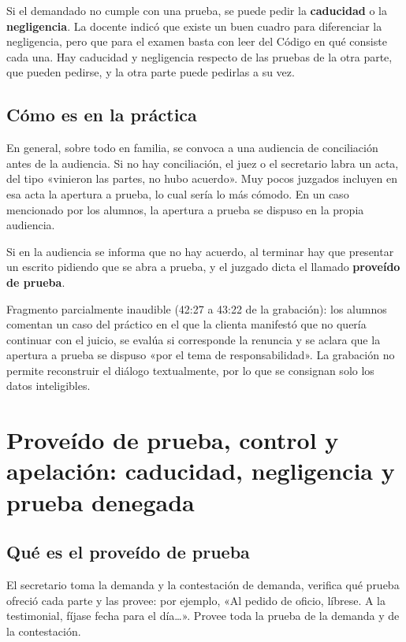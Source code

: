 \documentclass[12pt,oneside]{book}
\begin{document}
Si el demandado no cumple con una prueba, se puede pedir la \textbf{caducidad} o la \textbf{negligencia}. La docente indicó que existe un buen cuadro para diferenciar la negligencia, pero que para el examen basta con leer del Código en qué consiste cada una. Hay caducidad y negligencia respecto de las pruebas de la otra parte, que pueden pedirse, y la otra parte puede pedirlas a su vez.

\subsection{Cómo es en la práctica}

En general, sobre todo en familia, se convoca a una audiencia de conciliación antes de la audiencia. Si no hay conciliación, el juez o el secretario labra un acta, del tipo «vinieron las partes, no hubo acuerdo». Muy pocos juzgados incluyen en esa acta la apertura a prueba, lo cual sería lo más cómodo. En un caso mencionado por los alumnos, la apertura a prueba se dispuso en la propia audiencia.

Si en la audiencia se informa que no hay acuerdo, al terminar hay que presentar un escrito pidiendo que se abra a prueba, y el juzgado dicta el llamado \textbf{proveído de prueba}.

\begin{note}
Fragmento parcialmente inaudible (42:27 a 43:22 de la grabación): los alumnos comentan un caso del práctico en el que la clienta manifestó que no quería continuar con el juicio, se evalúa si corresponde la renuncia y se aclara que la apertura a prueba se dispuso «por el tema de responsabilidad». La grabación no permite reconstruir el diálogo textualmente, por lo que se consignan solo los datos inteligibles.
\end{note}

\section{Proveído de prueba, control y apelación: caducidad, negligencia y prueba denegada}

\subsection{Qué es el proveído de prueba}

El secretario toma la demanda y la contestación de demanda, verifica qué prueba ofreció cada parte y las provee: por ejemplo, «Al pedido de oficio, líbrese. A la testimonial, fíjase fecha para el día\ldots». Provee toda la prueba de la demanda y de la contestación.
\end{document}
